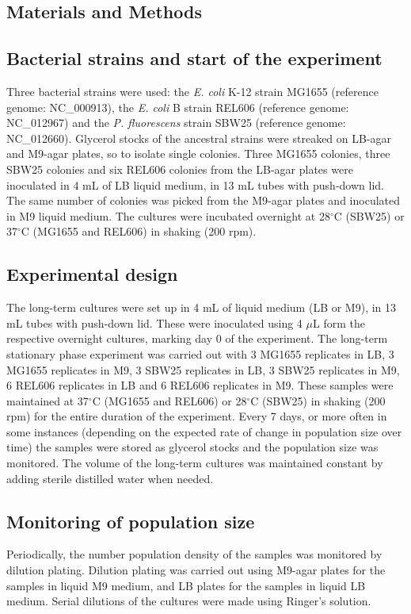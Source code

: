 \documentclass[
    11pt,
    a4paper,
    twoside
]{article} %
\begin{document}
\begin{multicols}{2}
\section*{Materials and Methods}

\subsection*{Bacterial strains and start of the experiment}
Three bacterial strains were used: the \textit{E. coli} K-12 strain MG1655 (reference genome: NC\_000913), the \textit{E. coli} B strain REL606 (reference genome: NC\_012967) and the \textit{P. fluorescens} strain SBW25 (reference genome: NC\_012660).
Glycerol stocks of the ancestral strains were streaked on LB-agar and M9-agar plates, so to isolate single colonies.
Three MG1655 colonies, three SBW25 colonies and six REL606 colonies from the LB-agar plates were inoculated in 4 mL of LB liquid medium, in 13 mL tubes with push-down lid.
The same number of colonies was picked from the M9-agar plates and inoculated in M9 liquid medium.
The cultures were incubated overnight at 28$^\circ$C (SBW25) or 37$^\circ$C (MG1655 and REL606) in shaking (200 rpm).

\subsection*{Experimental design}
The long-term cultures were set up in 4 mL of liquid medium (LB or M9), in 13 mL tubes with push-down lid.
These were inoculated using 4 $\mu$L form the respective overnight cultures, marking day 0 of the experiment.
The long-term stationary phase experiment was carried out with 3 MG1655 replicates in LB, 3 MG1655 replicates in M9, 3 SBW25 replicates in LB, 3 SBW25 replicates in M9, 6 REL606 replicates in LB and 6 REL606 replicates in M9.
These samples were maintained at 37$^\circ$C (MG1655 and REL606) or 28$^\circ$C (SBW25) in shaking (200 rpm) for the entire duration of the experiment.
Every 7 days, or more often in some instances (depending on the expected rate of change in population size over time) the samples were stored as glycerol stocks and the population size was monitored.
The volume of the long-term cultures was maintained constant by adding sterile distilled water when needed.

\subsection*{Monitoring of population size}
Periodically, the number population density of the samples was monitored by dilution plating.
Dilution plating was carried out using M9-agar plates for the samples in liquid M9 medium, and LB plates for the samples in liquid LB medium.
Serial dilutions of the cultures were made using Ringer's solution.


\end{multicols}
\end{document}

